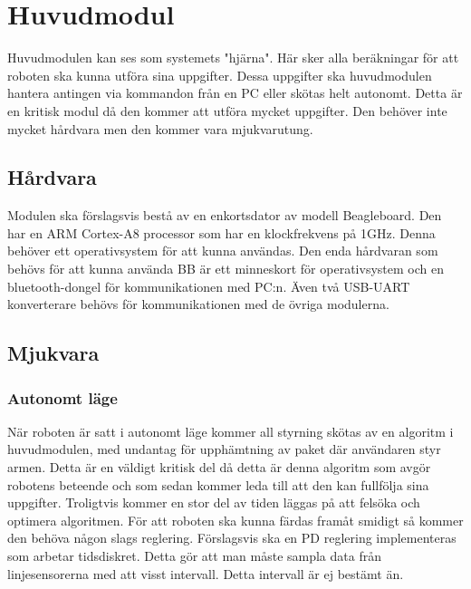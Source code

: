 
\section{Huvudmodul}
Huvudmodulen kan ses som systemets "hjärna". Här sker alla beräkningar för att roboten ska kunna utföra sina uppgifter. Dessa uppgifter ska huvudmodulen hantera antingen via kommandon från en PC eller skötas helt autonomt. Detta är en kritisk modul då den kommer att utföra mycket uppgifter. Den behöver inte mycket hårdvara men den kommer vara mjukvarutung.
\subsection{Hårdvara}
Modulen ska förslagsvis bestå av en enkortsdator av modell Beagleboard. Den har en ARM Cortex-A8 processor som har en klockfrekvens på 1GHz. Denna behöver ett operativsystem för att kunna användas. Den enda hårdvaran som behövs för att kunna använda BB är ett minneskort för operativsystem och en bluetooth-dongel för kommunikationen med PC:n. Även två USB-UART konverterare behövs för kommunikationen med de övriga modulerna.
\subsection{Mjukvara}

\subsubsection{Autonomt läge}
När roboten är satt i autonomt läge kommer all styrning skötas av en algoritm i huvudmodulen, med undantag för upphämtning av paket där användaren styr armen. Detta är en väldigt kritisk del då detta är denna algoritm som avgör robotens beteende och som sedan kommer leda till att den kan fullfölja sina uppgifter. Troligtvis kommer en stor del av tiden läggas på att felsöka och optimera algoritmen.
För att roboten ska kunna färdas framåt smidigt så kommer den behöva någon slags reglering. Förslagsvis ska en PD reglering implementeras som arbetar tidsdiskret. Detta gör att man måste sampla data från linjesensorerna med att visst intervall. Detta intervall är ej bestämt än.



